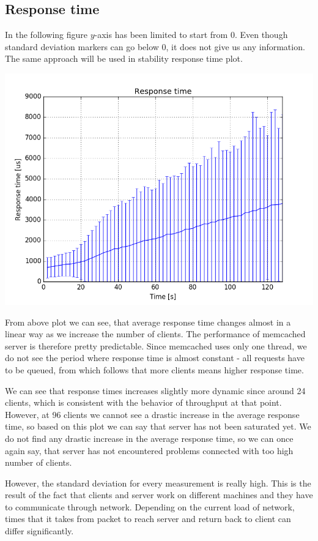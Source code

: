 \documentclass[11pt]{article}
\begin{document}
\subsection{Response time}\label{sec:baseline:rt}

In the following figure $y$-axis has been limited to start from 0. Even though standard deviation markers can go below 0, it does not give us any information. The same approach will be used in stability response time plot.

\includegraphics[scale=0.7]{baseline_response_time.png}
\medskip

From above plot we can see, that average response time changes almost in a linear way as we increase the number of clients. The performance of memcached server is therefore pretty predictable. Since memcached uses only one thread, we do not see the period where response time is almost constant - all requests have to be queued, from which follows that more clients means higher response time.

We can see that response times increases slightly more dynamic since around 24 clients, which is consistent with the behavior of throughput at that point. However, at 96 clients we cannot see a drastic increase in the average response time, so based on this plot we can say that server has not been saturated yet. We do not find any drastic increase in the average response time, so we can once again say, that server has not encountered problems connected with too high number of clients.

However, the standard deviation for every measurement is really high. This is the result of the fact that clients and server work on different machines and they have to communicate through network. Depending on the current load of network, times that it takes from packet to reach server and return back to client can differ significantly.
\end{document}
